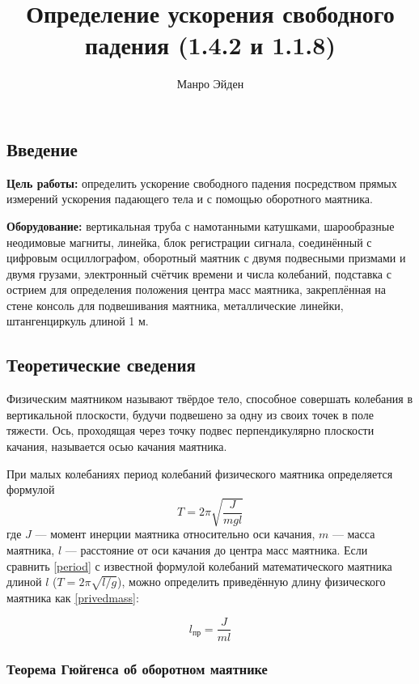 \documentclass[a4paper, 12pt]{article}
\title{\textbf{Определение ускорения свободного падения \newline
(1.4.2 и 1.1.8)}}
\author{Манро Эйден}
\date{}
\begin{document}
\maketitle

\begin{center}
    \section*{Введение}
\end{center}

\noindent \textbf{Цель работы:} определить ускорение свободного падения посредством прямых измерений ускорения падающего тела и с помощью оборотного маятника.

\bigskip

\noindent \textbf{Оборудование:} вертикальная труба с намотанными катушками, шарообразные 
неодимовые магниты, линейка, блок регистрации сигнала, соединённый с цифровым осциллографом, оборотный маятник с двумя подвесными призмами и двумя грузами, электронный счётчик времени и числа колебаний,
подставка с острием для определения положения центра масс маятника, закреплённая на стене консоль для подвешивания маятника, металлические линейки, штангенциркуль длиной 1 м.

\bigskip

\begin{center}
        \subsection*{Теоретические сведения}
        Физическим маятником называют твёрдое тело, способное совершать 
колебания в вертикальной плоскости, будучи подвешено за одну из своих 
точек в поле тяжести. Ось, проходящая через точку подвес перпендикулярно плоскости качания, называется осью качания маятника.

При малых колебаниях период колебаний физического маятника определяется формулой
\begin{equation}
  T = 2\pi \sqrt{\frac{J}{mgl}}
  \label{period}
\end{equation}
где $J$ — момент инерции маятника относительно оси качания, $m$ — масса 
маятника, $l$ — расстояние от оси качания до центра масс маятника.
Если сравнить \eqref{period} с известной формулой колебаний математического 
маятника длиной $l$ ($T = 2\pi\sqrt{l/g}$), можно определить приведённую длину физического маятника как \eqref{privedmass}:

\begin{equation}
    l_{\text{пр}} = \frac{J}{ml}
    \label{privedmass}
\end{equation}

\end{center}
\begin{center}
    
\subsubsection*{Теорема Гюйгенса об оборотном маятнике}
\end{center}
\end{document}
